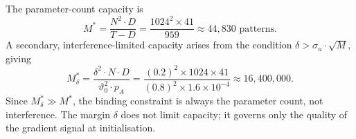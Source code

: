 \documentclass{scrartcl}
\begin{document}
The parameter-count capacity is
\[
M^* = \frac{N^2 \cdot D}{T - D} = \frac{1024^2 \times 41}{959} \approx 44{,}830 \text{ patterns.}
\]
A secondary, interference-limited capacity arises from the condition $\delta > \sigma_u \cdot \sqrt{M}$, giving
\begin{equation}
M^*_\delta = \frac{\delta^2 \cdot N \cdot D}{\vartheta_0^2 \cdot p_A} = \frac{(0.2)^2 \times 1024 \times 41}{(0.8)^2 \times 1.6\times10^{-4}} \approx 16{,}400{,}000.
\label{eq:M_cap_delta}
\end{equation}
Since $M^*_\delta \gg M^*$, the binding constraint is always the parameter count, not interference. The margin $\delta$ does not limit capacity; it governs only the quality of the gradient signal at initialisation.

% 
% 
\printbibliography
\end{document}
